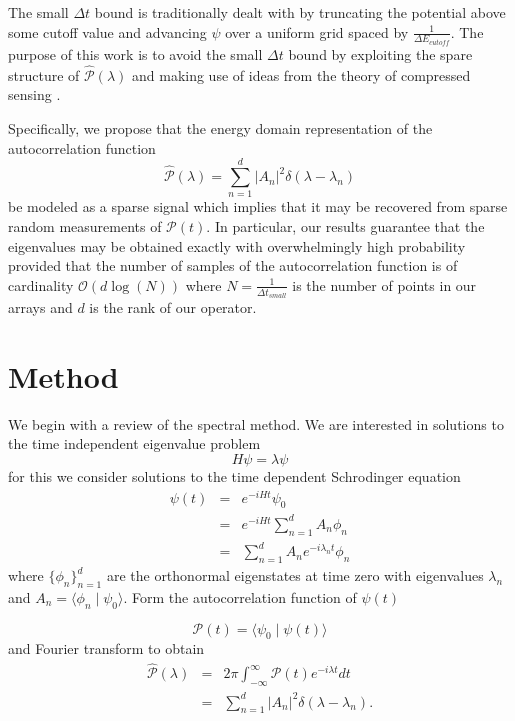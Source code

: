 \documentclass[11pt]{amsart}
\theoremstyle{remark}
\begin{document}
The small $\Delta t$ bound is traditionally dealt with by truncating the potential above some cutoff value and advancing $\psi$ over a uniform grid spaced by $\frac{1}{\Delta E_{cutoff}}$. The purpose of this work is to avoid the small $\Delta t$ bound by exploiting the spare structure of $\hat{\mathcal{P}}(\lambda)$ and making use of ideas from the theory of compressed sensing \cite{Candes2006}.

Specifically, we propose that the energy domain representation of the autocorrelation function
\begin{equation}
\hat{\mathcal{P}}(\lambda) = \sum_{n=1}^d |A_n|^2 \delta(\lambda-\lambda_n)
\end{equation}
be modeled as a sparse signal which implies that it may be recovered from sparse random measurements of $\mathcal{P}(t)$. In particular, our results guarantee that the eigenvalues may be obtained exactly with overwhelmingly high probability provided that the number of samples of the autocorrelation function is of cardinality $\mathcal{O}(d \log(N))$ where $N=\frac{1}{\Delta t_{small}}$ is the number of points in our arrays and $d$ is the rank of our operator.

\section{Method}

We begin with a review of the spectral method. We are interested in solutions to the time independent eigenvalue problem
\begin{equation}
H \psi = \lambda \psi
\end{equation}
for this we consider solutions to the time dependent Schrodinger equation
\begin{eqnarray}
\psi(t) &=& e^{-iHt}\psi_0 \\
&=& e^{-iHt} \sum_{n=1}^d A_n \phi_n \\ \label{timdepcoh}
&=& \sum_{n=1}^d A_n e^{-i\lambda_n t} \phi_n
\end{eqnarray}
where $\{ \phi_n \}_{n=1}^d$ are the orthonormal eigenstates at time zero with eigenvalues $\lambda_n$ and $A_n = \langle \phi_n \mid \psi_0 \rangle$. Form the autocorrelation function of $\psi(t)$

\begin{equation}\label{autocor}
\mathcal{P}(t) = \langle \psi_0 \mid \psi(t) \rangle
\end{equation}
and Fourier transform to obtain
\begin{eqnarray}
\hat{\mathcal{P}}(\lambda) &=& 2\pi \int_{-\infty}^\infty \mathcal{P}(t) e^{-i\lambda t}dt \\
\label{ftautocor}
&=& \sum_{n=1}^d |A_n|^2 \delta(\lambda - \lambda_n).
\end{eqnarray}
\end{document}
